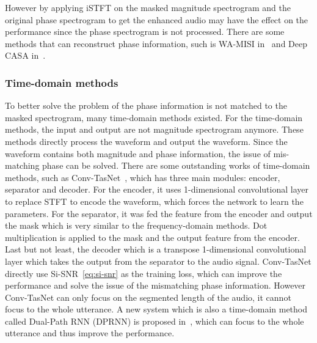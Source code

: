 However by applying iSTFT on the masked magnitude spectrogram and the original phase spectrogram to get the enhanced audio may have the effect on the performance since the phase spectrogram is not processed.
There are some methods that can reconstruct phase information, such is WA-MISI in~\cite{WA-MISI} and Deep CASA in~\cite{Deep_CASA}.

\subsubsection{Time-domain methods}

To better solve the problem of the phase information is not matched to the masked spectrogram, many time-domain methods existed.
For the time-domain methods, the input and output are not magnitude spectrogram anymore.
These methods directly process the waveform and output the waveform.
Since the waveform contains both magnitude and phase information, the issue of mis-matching phase can be solved.
There are some outstanding works of time-domain methods, such as Conv-TasNet~\cite{conv_tasnet}, which has three main modules: encoder, separator and decoder.
For the encoder, it uses 1-dimensional convolutional layer to replace STFT to encode the waveform, which forces the network to learn the parameters.
For the separator, it was fed the feature from the encoder and output the mask which is very similar to the frequency-domain methods.
Dot multiplication is applied to the mask and the output feature from the encoder.
Last but not least, the decoder which is a transpose 1-dimensional convolutional layer which takes the output from the separator to the audio signal.
Conv-TasNet directly use Si-SNR~\ref{eq:si-snr} as the training loss, which can improve the performance and solve the issue of the mismatching phase information.
However Conv-TasNet can only focus on the segmented length of the audio, it cannot focus to the whole utterance.
A new system which is also a time-domain method called Dual-Path RNN (DPRNN) is proposed in~\cite{dprnn}, which can focus to the whole utterance and thus improve the performance.
